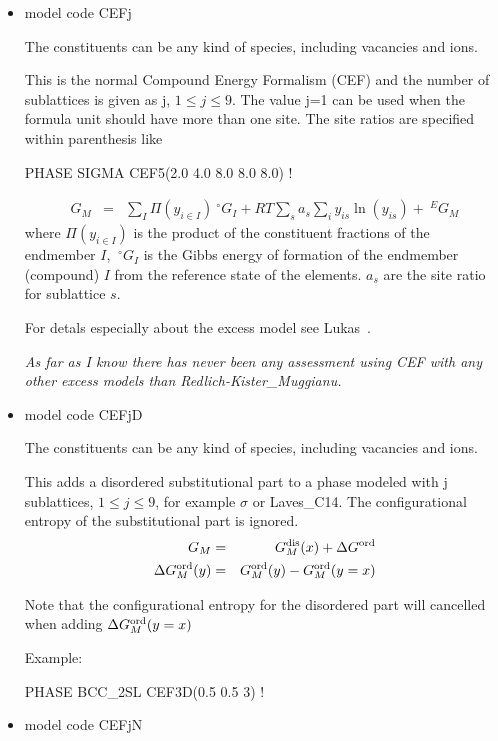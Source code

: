 \documentclass[12pt]{article}
\begin{document}
\begin{itemize}
\item model code CEFj

  The constituents can be any kind of species, including vacancies and
  ions.

  This is the normal Compound Energy Formalism (CEF) and the number of
  sublattices is given as j, $1 \leq j \leq 9$.  The value j=1 can be
  used when the formula unit should have more than one site.  The site
  ratios are specified within parenthesis like
  
  PHASE SIGMA CEF5(2.0 4.0 8.0 8.0 8.0) !
  
  \begin{eqnarray}
    G_M &=& \sum_I \Pi(y_{i\in I}) ~^{\circ}G_I + RT \sum_s a_s \sum_i y_{is}\ln(y_{is}) + ~^EG_M
  \end{eqnarray}
  where $\Pi(y_{i\in I})$ is the product of the constituent fractions
  of the endmember $I$, $~^{\circ}G_I$ is the Gibbs energy of
  formation of the endmember (compound) $I$ from the reference state
  of the elements.  $a_s$ are the site ratio for sublattice $s$.

  For detals especially about the excess model see Lukas~\cite{07Luk}.

  {\em As far as I know there has never been any assessment using CEF with
  any other excess models than Redlich-Kister\_Muggianu.}

\item model code CEFjD

  The constituents can be any kind of species, including vacancies and
  ions.

  This adds a disordered substitutional part to a phase modeled with j
  sublattices, $1\leq j \leq 9$, for example $\sigma$ or Laves\_C14.
  The configurational entropy of the substitutional part is
  ignored.
  \begin{eqnarray}
    G_M &=& G_M^{\rm dis}(x) + \Delta G^{\rm ord}\\
    \Delta G_M^{\rm ord}(y) &=& G_M^{\rm ord}(y) - G_M^{\rm ord}(y=x) \label{eq:deltag}
  \end{eqnarray}

  Note that the configurational entropy for the disordered part will
  cancelled when adding $\Delta G_M^{\rm ord}(y=x)$

  Example:

  PHASE BCC\_2SL CEF3D(0.5 0.5 3) !
  
\item model code CEFjN\label{sc:cefjn}


\end{itemize}
\end{document}
